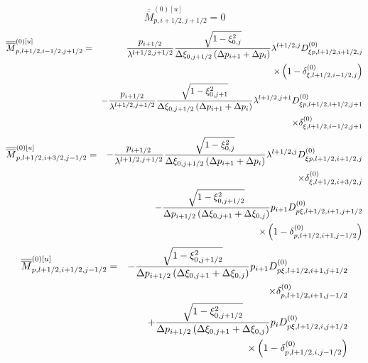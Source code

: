 \begin{equation}
\overline{\overline{M}}_{p,i+1/2,j+1/2}^{\left( 0\right) \left[ u\right] }=0
\end{equation}%
\begin{eqnarray}
\overline{\overline{M}}_{p,l+1/2,i-1/2,j+1/2}^{\left( 0\right) \left[ u%
\right] } &=&\frac{p_{i+1/2}}{\lambda ^{l+1/2,j+1/2}}\frac{\sqrt{1-\xi
_{0,j}^{2}}}{\Delta \xi _{0,j+1/2}\left( \Delta p_{i+1}+\Delta p_{i}\right) }%
\lambda ^{l+1/2,j}D_{\xi p,l+1/2,i+1/2,j}^{\left( 0\right) }  \notag \\
&&\times \left( 1-\delta _{\xi ,l+1/2,i-1/2,j}^{\left( 0\right) }\right)  
\notag \\
&&-\frac{p_{i+1/2}}{\lambda ^{l+1/2,j+1/2}}\frac{\sqrt{1-\xi _{0,j+1}^{2}}}{%
\Delta \xi _{0,j+1/2}\left( \Delta p_{i+1}+\Delta p_{i}\right) }\lambda
^{l+1/2,j+1}D_{\xi p,l+1/2,i+1/2,j+1}^{\left( 0\right) }  \notag \\
&&\times \delta _{\xi ,l+1/2,i-1/2,j+1}^{\left( 0\right) }
\end{eqnarray}%
\begin{eqnarray}
\overline{\overline{M}}_{p,l+1/2,i+3/2,j-1/2}^{\left( 0\right) \left[ u%
\right] } &=&-\frac{p_{i+1/2}}{\lambda ^{l+1/2,j+1/2}}\frac{\sqrt{1-\xi
_{0,j}^{2}}}{\Delta \xi _{0,j+1/2}\left( \Delta p_{i+1}+\Delta p_{i}\right) }%
\lambda ^{l+1/2,j}D_{\xi p,l+1/2,i+1/2,j}^{\left( 0\right) }  \notag \\
&&\times \delta _{\xi ,l+1/2,i+3/2,j}^{\left( 0\right) }  \notag \\
&&-\frac{\sqrt{1-\xi _{0,j+1/2}^{2}}}{\Delta p_{i+1/2}\left( \Delta \xi
_{0,j+1}+\Delta \xi _{0,j}\right) }p_{i+1}D_{p\xi ,l+1/2,i+1,j+1/2}^{\left(
0\right) }  \notag \\
&&\times \left( 1-\delta _{p,l+1/2,i+1,j-1/2}^{\left( 0\right) }\right) 
\end{eqnarray}%
\begin{eqnarray}
\overline{\overline{M}}_{p,l+1/2,i+1/2,j-1/2}^{\left( 0\right) \left[ u%
\right] } &=&-\frac{\sqrt{1-\xi _{0,j+1/2}^{2}}}{\Delta p_{i+1/2}\left(
\Delta \xi _{0,j+1}+\Delta \xi _{0,j}\right) }p_{i+1}D_{p\xi
,l+1/2,i+1,j+1/2}^{\left( 0\right) }  \notag \\
&&\times \delta _{p,l+1/2,i+1,j-1/2}^{\left( 0\right) }  \notag \\
&&+\frac{\sqrt{1-\xi _{0,j+1/2}^{2}}}{\Delta p_{i+1/2}\left( \Delta \xi
_{0,j+1}+\Delta \xi _{0,j}\right) }p_{i}D_{p\xi ,l+1/2,i,j+1/2}^{\left(
0\right) }  \notag \\
&&\times \left( 1-\delta _{p,l+1/2,i,j-1/2}^{\left( 0\right) }\right) 
\end{eqnarray}%
